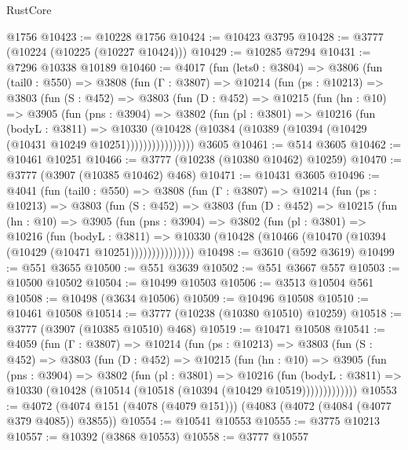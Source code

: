\begin{lexlean}{RustCore}
\begin{coremodule}
    @1756
@10423 := @10228 @1756
@10424 := @10423 @3795
@10428 := @3777 (@10224 (@10225 (@10227 @10424)))
@10429 := @10285 @7294
@10431 := @7296 @10338 @10189
@10460 := @4017
    (fun (lets0 : @3804) =>
    @3806
      (fun (tail0 : @550) =>
      @3808
        (fun (Γ : @3807) =>
        @10214
          (fun (ps : @10213) =>
          @3803
            (fun (S : @452) =>
            @3803
              (fun (D : @452) =>
              @10215
                (fun (hn : @10) =>
                @3905
                  (fun (pns : @3904) =>
                  @3802
                    (fun (pl : @3801) =>
                    @10216
                      (fun (bodyL : @3811) =>
                      @10330
                        (@10428
                          (@10384 (@10389 (@10394 (@10429 (@10431 @10249 @10251))))))))))))))))
    @3605
@10461 := @514 @3605
@10462 := @10461 @10251
@10466 := @3777 (@10238 (@10380 @10462) @10259)
@10470 := @3777 (@3907 (@10385 @10462) @468)
@10471 := @10431 @3605
@10496 := @4041
    (fun (tail0 : @550) =>
    @3808
      (fun (Γ : @3807) =>
      @10214
        (fun (ps : @10213) =>
        @3803
          (fun (S : @452) =>
          @3803
            (fun (D : @452) =>
            @10215
              (fun (hn : @10) =>
              @3905
                (fun (pns : @3904) =>
                @3802
                  (fun (pl : @3801) =>
                  @10216
                    (fun (bodyL : @3811) =>
                    @10330 (@10428 (@10466 (@10470 (@10394 (@10429 (@10471 @10251)))))))))))))))
@10498 := @3610 (@592 @3619)
@10499 := @551 @3655
@10500 := @551 @3639
@10502 := @551 @3667 @557
@10503 := @10500 @10502
@10504 := @10499 @10503
@10506 := @3513 @10504 @561
@10508 := @10498 (@3634 @10506)
@10509 := @10496 @10508
@10510 := @10461 @10508
@10514 := @3777 (@10238 (@10380 @10510) @10259)
@10518 := @3777 (@3907 (@10385 @10510) @468)
@10519 := @10471 @10508
@10541 := @4059
    (fun (Γ : @3807) =>
    @10214
      (fun (ps : @10213) =>
      @3803
        (fun (S : @452) =>
        @3803
          (fun (D : @452) =>
          @10215
            (fun (hn : @10) =>
            @3905
              (fun (pns : @3904) =>
              @3802
                (fun (pl : @3801) =>
                @10216
                  (fun (bodyL : @3811) =>
                  @10330 (@10428 (@10514 (@10518 (@10394 (@10429 @10519)))))))))))))
@10553 := @4072 (@4074 @151 (@4078 (@4079 @151))) (@4083 (@4072 (@4084 (@4077 @379 @4085)) @3855))
@10554 := @10541 @10553
@10555 := @3775 @10213
@10557 := @10392 (@3868 @10553)
@10558 := @3777 @10557

\end{coremodule}
\end{lexlean}
